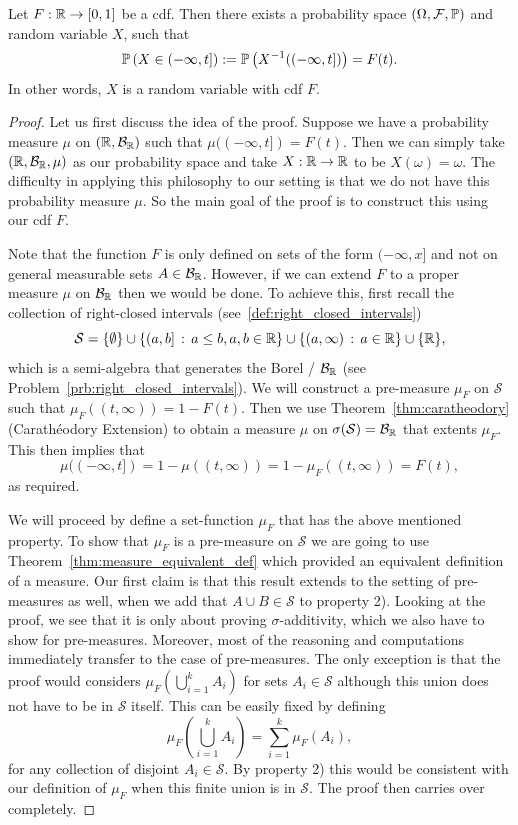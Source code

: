 \begin{theorem}\label{thm:construction_random_variable}
Let $F : \mathbb R \to [0,1]$ be a cdf. Then there exists a probability space  $(\Omega,\mathcal F, \mathbb P)$ and random variable $X$, such that 
\[
	\mathbb P\left(X \in (-\infty,t]\right) := \mathbb P\left(X^{-1}((-\infty,t])\right) = F(t).
\]
In other words, $X$ is a random variable with cdf $F$.
\end{theorem}

\begin{proof}%
Let us first discuss the idea of the proof. Suppose we have a probability measure $\mu$ on $(\mathbb R, \mathcal B_{\mathbb R})$ such that $\mu((-\infty,t]) = F(t)$. Then we can simply take $(\mathbb R, \mathcal B_{\mathbb R}, \mu)$ as our probability space and take $X : \mathbb R \to \mathbb R$ to be $X(\omega) = \omega$. The difficulty in applying this philosophy to our setting is that we do not have this probability measure $\mu$. So the main goal of the proof is to construct this using our cdf $F$. 

Note that the function $F$ is only defined on sets of the form $(-\infty,x]$ and not on general measurable sets $A \in \mathcal B_{\mathbb R}$. However, if we can extend $F$ to a proper measure $\mu$ on $\mathcal B_{\mathbb R}$ then we would be done. To achieve this, first recall the collection of right-closed intervals (see~\eqref{def:right_closed_intervals})
\[
	\mathcal{S} = \{\emptyset\} \cup \{(a,b] \, : \, a \le b, a,b \in \mathbb R\} \cup \{(a, \infty) \, : \, a \in \mathbb R\} \cup \{\mathbb R\},
\] 
which is a semi-algebra that generates the Borel \sigalg/ $\mathcal B_{\mathbb R}$ (see Problem~\ref{prb:right_closed_intervals}). We will construct a pre-measure $\mu_F$ on $\mathcal{S}$ such that $\mu_F((t,\infty)) = 1 - F(t)$. Then we use Theorem~\ref{thm:caratheodory} (Carath\'{e}odory Extension) to obtain a measure $\mu$ on $\sigma(\mathcal{S}) = \mathcal B_{\mathbb R}$ that extents $\mu_F$. This then implies that 
\[
	\mu((-\infty,t]) = 1 - \mu((t,\infty)) = 1 - \mu_F((t,\infty)) = F(t),
\]
as required. 

We will proceed by define a set-function $\mu_F$ that has the above mentioned property. To show that $\mu_F$ is a pre-measure on $\mathcal{S}$ we are going to use Theorem~\ref{thm:measure_equivalent_def} which provided an equivalent definition of a measure. Our first claim is that this result extends to the setting of pre-measures as well, when we add that $A \cup B \in \mathcal{S}$ to property 2). Looking at the proof, we see that it is only about proving $\sigma$-additivity, which we also have to show for pre-measures. Moreover, most of the reasoning and computations immediately transfer to the case of pre-measures. The only exception is that the proof would considers $\mu_F(\bigcup_{i = 1}^k A_i)$ for sets $A_i \in \mathcal{S}$ although this union does not have to be in $\mathcal{S}$ itself. This can be easily fixed by defining
\[
	\mu_F(\bigcup_{i = 1}^k A_i) = \sum_{i = 1}^k \mu_F(A_i),
\]
for any collection of disjoint $A_i \in \mathcal{S}$. By property 2) this would be consistent with our definition of $\mu_F$ when this finite union is in $\mathcal{S}$. The proof then carries over completely.


\end{proof}
